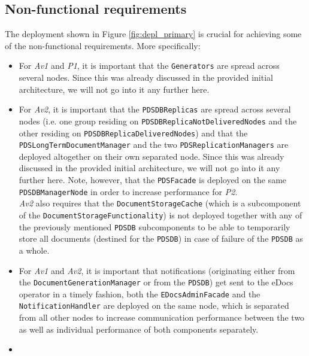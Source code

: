 \documentclass[a4paper,10pt]{article}
\begin{document}
\subsection*{Non-functional requirements}
The deployment shown in Figure \ref{fig:depl_primary} is crucial for achieving some of the non-functional requirements. More specifically:
\begin{itemize}
\item
For \textit{Av1} and \textit{P1}, it is important that the \texttt{Generators} are spread across several nodes. Since this was already discussed in the provided initial architecture, we will not go into it any further here.
\item
For \textit{Av2}, it is important that the \texttt{PDSDBReplicas} are spread across several nodes (i.e. one group residing on \texttt{PDSDBReplicaNotDeliveredNodes} and the other residing on \texttt{PDSDBReplicaDeliveredNodes}) and that the \texttt{PDSLongTermDocumentManager} and the two \texttt{PDSReplicationManagers} are deployed altogether on their own separated node. Since this was already discussed in the provided initial architecture, we will not go into it any further here. Note, however, that the \texttt{PDSFacade} is deployed on the same \texttt{PDSDBManagerNode} in order to increase performance for \textit{P2}.\\
\textit{Av2} also requires that the \texttt{DocumentStorageCache} (which is a subcomponent of the \texttt{DocumentStorageFunctionality}) is not deployed together with any of the previously mentioned \texttt{PDSDB} subcomponents to be able to temporarily store all documents (destined for the \texttt{PDSDB}) in case of failure of the \texttt{PDSDB} as a whole.
\item
For \textit{Av1} and \textit{Av2}, it is important that notifications (originating either from the \texttt{DocumentGenerationManager} or from the \texttt{PDSDB}) get sent to the eDocs operator in a timely fashion, both the \texttt{EDocsAdminFacade} and the \texttt{NotificationHandler} are deployed on the same node, which is separated from all other nodes to increase communication performance between the two as well as individual performance of both components separately.
\item

\end{itemize}
\end{document}
